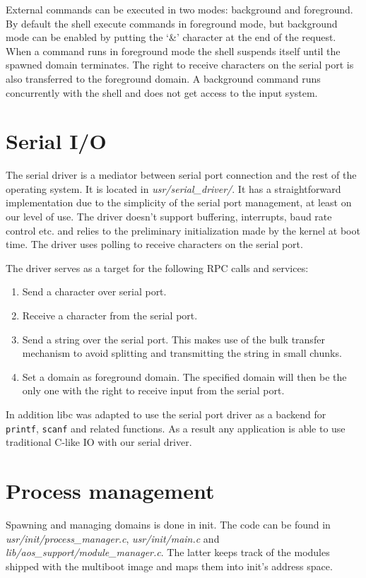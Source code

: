 \documentclass[a4paper,10pt]{article}
\newcommand{\filepath}[1]{\emph{ #1}}
\begin{document}
External commands can be executed in two modes: background and foreground.
By default the shell execute commands in foreground mode, but background mode can be enabled by putting the `\&' character at the end of the request.
When a command runs in foreground mode the shell suspends itself until the spawned domain terminates.
The right to receive characters on the serial port is also transferred to the foreground domain.
A background command runs concurrently with the shell and does not get access to the input system.
    	    	
\section{Serial I/O}
The serial driver is a mediator between serial port connection and the rest of the operating system.
It is located in \filepath{usr/serial\_driver/}.
It has a straightforward implementation due to the simplicity of the serial port management, at least on our level of use.
The driver doesn't support buffering, interrupts, baud rate control etc. and relies to the preliminary initialization made by the kernel at boot time.
The driver uses polling to receive characters on the serial port.

The driver serves as a target for the following RPC calls and services:
\begin{enumerate}
	\item Send a character over serial port.
	\item Receive a character from the serial port.
	\item Send a string over the serial port. This makes use of the bulk transfer mechanism to avoid splitting and transmitting the string in small chunks.
	\item Set a domain as foreground domain. The specified domain will then be the only one with the right to receive input from the serial port.
\end{enumerate}

In addition libc was adapted to use the serial port driver as a backend for \lstinline!printf!, \lstinline!scanf! and related functions.
As a result any application is able to use traditional C-like IO with our serial driver.

\section{Process management}
\label{sec:process-management}

Spawning and managing domains is done in init.
The code can be found in \filepath{usr/init/process\_manager.c}, \filepath{usr/init/main.c} and \filepath{lib/aos\_support/module\_manager.c}.
The latter keeps track of the modules shipped with the multiboot image and maps them into init's address space.
\end{document}
